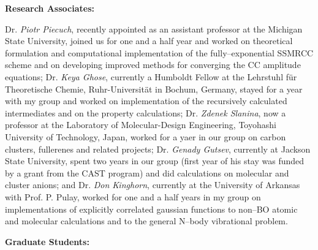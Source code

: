 \vspace{2mm}

\noindent
{\bf Research Associates:}

Dr. {\em Piotr Piecuch}, recently appointed as an 
assistant professor at the Michigan State University, joined us for
one and a half year and worked on theoretical formulation and 
computational implementation of the fully--exponential
SSMRCC scheme and on developing improved 
methods for converging the CC amplitude equations;  
Dr. {\em Keya Ghose}, 
currently a Humboldt Fellow at the 
Lehrstuhl f\"{u}r Theoretische Chemie, Ruhr-Universit\"{a}t in Bochum,
Germany, stayed for a year with my group and 
worked on implementation of the recursively calculated
intermediates and on the property calculations;  
Dr. {\em  Zdenek Slanina}, 
now a professor at the Laboratory
of Molecular-Design Engineering,
Toyohashi University of Technology, Japan,
worked for a yaer in our group on carbon clusters, fullerenes and
related projects;  
Dr. {\em Genady Gutsev}, 
currently
at Jackson State University, 
spent two years in our group (first year of his stay was
funded by a grant from the CAST program) and did 
calculations on molecular and cluster anions; 
and Dr. {\em Don Kinghorn}, 
currently at the University of Arkansas with Prof. P. Pulay,
worked for one and a half years in my group 
on implementations of explicitly correlated gaussian functions
to non--BO atomic and molecular calculations and 
to the general N--body vibrational problem.

\vspace{2mm}

\noindent
{\bf Graduate Students:}

